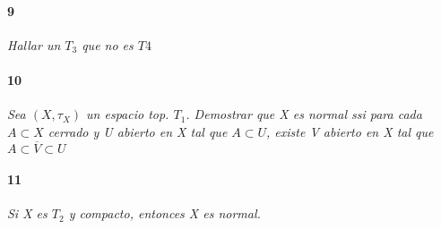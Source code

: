 \documentclass[12pt]{article}
\begin{document}
\paragraph{9}
\textit{Hallar un $T_3$ que no es $T4$}

\paragraph{10}
\textit{Sea $(X,\tau_X)$ un  espacio top. $T_1$. Demostrar que X es normal ssi para cada $A\subset X$ cerrado y U abierto en X tal que $A\subset U$, existe V abierto en X tal que $A\subset\overline{V}\subset U$}

\paragraph{11}
\textit{Si X es $T_2$ y compacto, entonces X es normal.}
\end{document}
